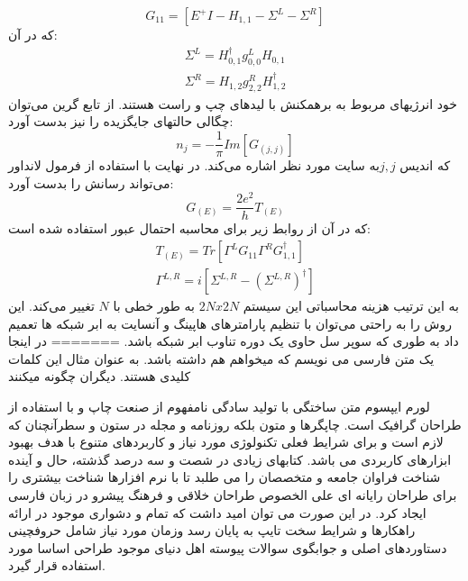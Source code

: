 \begin{equation}
    G_{11} = \left[E^+I- H_{1,1}- \Sigma^L-\Sigma^R\right]
\end{equation}
که در آن: 
\begin{equation}
    \begin{split}
        \Sigma^L = H^{\dagger}_{0,1} g^{L}_{0,0}H_{0,1}\\
        \Sigma^R = H_{1,2} g^{R}_{2,2}H^{\dagger}_{1,2}
    \end{split}
\end{equation}
خود انرژیهای مربوط به برهمکنش با لیدهای چپ و راست هستند. از تابع گرین می‌توان چگالی حالتهای جایگزیده  را نیز بدست آورد: 
\begin{equation}
    n_j = - \frac{1}{\pi} Im[G_{(j,j)}]
\end{equation}
که اندیس $j,j $به سایت مورد نظر اشاره می‌کند. در نهایت با استفاده از فرمول لانداور می‌تواند رسانش را بدست آورد:
\begin{equation}
    G_{(E)} = \frac{2e^2}{h} T_{(E)}
\end{equation}
که در آن از روابط زیر برای محاسبه احتمال عبور استفاده شده است: 
\begin{equation}
    \begin{split}
        T_{(E)} = Tr[\Gamma^{L}G_{11}\Gamma^{R}G^{\dagger}_{1,1}]\\
        \Gamma^{L,R} = i [\Sigma^{L,R}- (\Sigma^{L,R})^{\dagger}]
    \end{split}
\end{equation}
به این ترتیب هزینه محاسباتی این سیستم  $2N x 2N$ به طور خطی با $N$ تغییر می‌کند. این روش را به راحتی می‌توان با تنظیم پارامترهای هاپینگ و آنسایت به ابر شبکه ها تعمیم داد به طوری که سوپر سل حاوی یک دوره تناوب ابر شبکه باشد. 
=======
در اینجا یک متن فارسی می نویسم که میخواهم  هم داشته باشد.
به عنوان مثال این  کلمات کلیدی هستند.
دیگران چگونه  میکنند

لورم ایپسوم متن ساختگی با تولید سادگی نامفهوم از صنعت چاپ و با استفاده از طراحان گرافیک است. چاپگرها و متون بلکه روزنامه و مجله در ستون و سطرآنچنان که لازم است و برای شرایط فعلی تکنولوژی مورد نیاز و کاربردهای متنوع با هدف بهبود ابزارهای کاربردی می باشد. کتابهای زیادی در شصت و سه درصد گذشته، حال و آینده شناخت فراوان جامعه و متخصصان را می طلبد تا با نرم افزارها شناخت بیشتری را برای طراحان رایانه ای علی الخصوص طراحان خلاقی و فرهنگ پیشرو در زبان فارسی ایجاد کرد. در این صورت می توان امید داشت که تمام و دشواری موجود در ارائه راهکارها و شرایط سخت تایپ به پایان رسد وزمان مورد نیاز شامل حروفچینی دستاوردهای اصلی و جوابگوی سوالات پیوسته اهل دنیای موجود طراحی اساسا مورد استفاده قرار گیرد.

